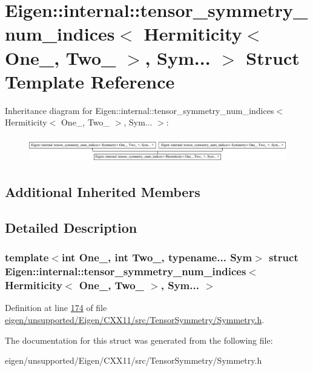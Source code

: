 \hypertarget{struct_eigen_1_1internal_1_1tensor__symmetry__num__indices_3_01_hermiticity_3_01_one___00_01_two___01_4_00_01_sym_8_8_8_01_4}{}\section{Eigen\+:\+:internal\+:\+:tensor\+\_\+symmetry\+\_\+num\+\_\+indices$<$ Hermiticity$<$ One\+\_\+, Two\+\_\+ $>$, Sym... $>$ Struct Template Reference}
\label{struct_eigen_1_1internal_1_1tensor__symmetry__num__indices_3_01_hermiticity_3_01_one___00_01_two___01_4_00_01_sym_8_8_8_01_4}
Inheritance diagram for Eigen\+:\+:internal\+:\+:tensor\+\_\+symmetry\+\_\+num\+\_\+indices$<$ Hermiticity$<$ One\+\_\+, Two\+\_\+ $>$, Sym... $>$\+:\begin{figure}[H]
\begin{center}
\leavevmode
\includegraphics[height=1.120000cm]{struct_eigen_1_1internal_1_1tensor__symmetry__num__indices_3_01_hermiticity_3_01_one___00_01_two___01_4_00_01_sym_8_8_8_01_4}
\end{center}
\end{figure}
\subsection*{Additional Inherited Members}


\subsection{Detailed Description}
\subsubsection*{template$<$int One\+\_\+, int Two\+\_\+, typename... Sym$>$\newline
struct Eigen\+::internal\+::tensor\+\_\+symmetry\+\_\+num\+\_\+indices$<$ Hermiticity$<$ One\+\_\+, Two\+\_\+ $>$, Sym... $>$}



Definition at line \hyperlink{eigen_2unsupported_2_eigen_2_c_x_x11_2src_2_tensor_symmetry_2_symmetry_8h_source_l00174}{174} of file \hyperlink{eigen_2unsupported_2_eigen_2_c_x_x11_2src_2_tensor_symmetry_2_symmetry_8h_source}{eigen/unsupported/\+Eigen/\+C\+X\+X11/src/\+Tensor\+Symmetry/\+Symmetry.\+h}.



The documentation for this struct was generated from the following file\+:\begin{DoxyCompactItemize}
\item 
eigen/unsupported/\+Eigen/\+C\+X\+X11/src/\+Tensor\+Symmetry/\+Symmetry.\+h\end{DoxyCompactItemize}

